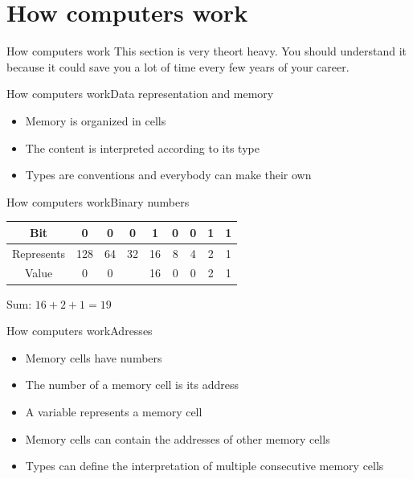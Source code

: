 \documentclass[aspectratio=169]{beamer}
\begin{document}
\section{How computers work}
\begin{frame}{How computers work}
	This section is very theort heavy.
	You should understand it because it could save you a lot of time every few years of your career.
\end{frame}

\begin{frame}{How computers work}{Data representation and memory}
\begin{itemize}
	\item Memory is organized in cells
	\item The content is interpreted according to its type
	\item Types are conventions and everybody can make their own
\end{itemize}
\end{frame}

\begin{frame}{How computers work}{Binary numbers}

\begin{tabular}{c|cccccccc}
	Bit        & 0   & 0  & 0  & 1  & 0 & 0 & 1 & 1 
	\pause
	\\ \hline
	Represents & 128 & 64 & 32 & 16 & 8 & 4 & 2 & 1 \\ 
	Value      & 0   & 0  &    & 16 & 0 & 0 & 2 & 1 \\
\end{tabular}
\pause
\vspace{2em}

Sum:
\begin{math}
	16 + 2 + 1 = 19
\end{math}
\end{frame}

\begin{frame}{How computers work}{Adresses}
\begin{itemize}
	\item Memory cells have numbers
	\item The number of a memory cell is its address
	\item A variable represents a memory cell
	\pause
	\item Memory cells can contain the addresses of other memory cells
	\item Types can define the interpretation of multiple consecutive memory cells
\end{itemize}
\end{frame}
\end{document}
